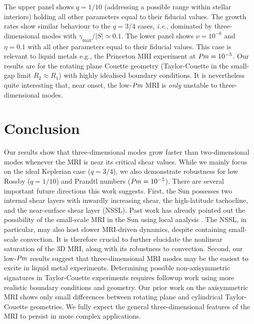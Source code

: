 \documentclass[openacc]{rsproca_new}%
\newcommand{\Prm}{\mbox{\textit{Pm}}}
\begin{document}
The upper panel shows $q=1/10$ (addressing a possible range within stellar interiors) holding all other parameters equal to their fiducial values.
The growth rates show similar behaviour to the $q=3/4$ cases, \textit{i.e.}, dominated by three-dimensional modes with $\gamma_{\max}/|S|\simeq0.1$.
The lower panel shows $\nu=10^{-6}$ and $\eta=0.1$ with all other parameters equal to their fiducial values. 
This case is relevant to liquid metals e.g., the Princeton MRI experiment \cite{2002JFM...462..365G}
at $\Prm=10^{-5}$. 
Our results are for the rotating plane Couette geometry (Taylor-Couette in the small-gap limit $R_{2}\approx{R}_{1}$) with highly idealised boundary conditions.
It is nevertheless quite interesting that, near onset, the low-$\Prm$ MRI is \emph{only} unstable to three-dimensional modes.

\section{Conclusion}
\label{sec:conclusion}

Our results show that three-dimensional modes grow faster than two-dimensional modes whenever the MRI is near its critical shear values.
While we mainly focus on the ideal Keplerian case ($q=3/4$), we also demonstrate robustness for low Rossby ($q=1/10$) and Prandtl numbers ($\Prm=10^{-5}$).
There are several important future directions this work suggests.
First, the Sun possesses two internal shear layers with inwardly increasing shear, the high-latitude tachocline, and the near-surface shear layer (NSSL). 
Past work has already pointed out the possibility of the small-scale MRI in the Sun using local analysis \cite{2007ApJ...667L.207P,2011MNRAS.411L..26M,2014ApJ...787...21K}.
The NSSL, in particular, may also host slower MRI-driven dynamics, despite containing small-scale convection.
It is therefore crucial to further elucidate the nonlinear saturation of the 3D MRI, along with its robustness to convection.
Second, our low-$\Prm$ results suggest that three-dimensional MRI modes may be the easiest to excite in liquid metal experiments.
Determining possible non-axisymmetric signatures in Taylor-Couette experiments requires followup work using more realistic boundary conditions and geometry. 
Our prior work on the axisymmetric MRI \cite{2017ApJ...841....1C,2017ApJ...841....2C} shows only small differences between rotating plane and cylindrical Taylor-Couette geometries. 
We fully expect the general three-dimensional features of the MRI to persist in more complex applications. 
\end{document}
